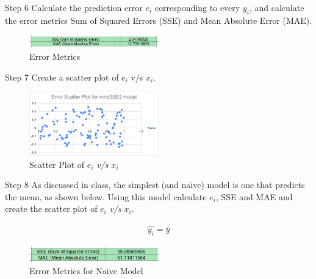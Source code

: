 \clearpage

\begin{custombox}[label={box:step6}]{Step 6}
	Calculate the prediction error $e_i$ corresponding to every $y_i$, and calculate the error metrics Sum of Squared Errors (SSE) and Mean Absolute Error (MAE).
\end{custombox}

\begin{figure}[H]
	\centering
	\includegraphics[width=0.5\textwidth]{Images/error-metrics-1.png}
	\caption{Error Metrics}
\end{figure}

\begin{custombox}[label={box:step7}]{Step 7}
	Create a scatter plot of $e_i$ v/s $x_i$.
\end{custombox}

\begin{figure}[H]
	\centering
	\includegraphics[width=0.5\textwidth]{Images/error1.png}
	\caption{Scatter Plot of $e_i$ \textit{v/s} $x_i$}
\end{figure}

\begin{custombox}[label={box:step8}] {Step 8}
	As discussed in class, the simplest (and na\"{\i}ve) model is one that predicts the mean, as shown below. Using this model calculate $e_i$, SSE and MAE and create the scatter plot of $e_i$ \textit{v/s} $x_i$.

	\begin{align}
		\widehat{y_i} = \overline{y}
	\end{align}
\end{custombox}

\begin{figure}[H]
	\centering
	\includegraphics[width=0.5\textwidth]{Images/error-metrics-2.png}
	\caption{Error Metrics for Na\"{\i}ve Model}
\end{figure}


